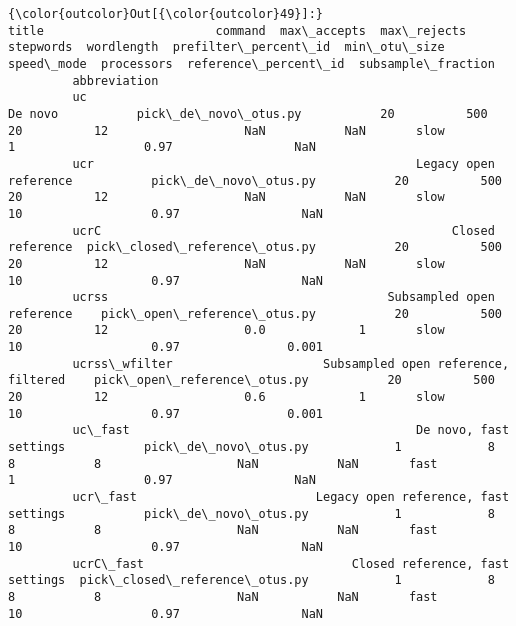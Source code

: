 \documentclass{article}
\begin{document}
            \begin{Verbatim}[commandchars=\\\{\}]
{\color{outcolor}Out[{\color{outcolor}49}]:}                                                                 title                        command  max\_accepts  max\_rejects  stepwords  wordlength  prefilter\_percent\_id  min\_otu\_size speed\_mode  processors  reference\_percent\_id  subsample\_fraction
         abbreviation                                                                                                                                                                                                                                              
         uc                                                            De novo           pick\_de\_novo\_otus.py           20          500         20          12                   NaN           NaN       slow           1                  0.97                 NaN
         ucr                                             Legacy open reference           pick\_de\_novo\_otus.py           20          500         20          12                   NaN           NaN       slow          10                  0.97                 NaN
         ucrC                                                 Closed reference  pick\_closed\_reference\_otus.py           20          500         20          12                   NaN           NaN       slow          10                  0.97                 NaN
         ucrss                                       Subsampled open reference    pick\_open\_reference\_otus.py           20          500         20          12                   0.0             1       slow          10                  0.97               0.001
         ucrss\_wfilter                     Subsampled open reference, filtered    pick\_open\_reference\_otus.py           20          500         20          12                   0.6             1       slow          10                  0.97               0.001
         uc\_fast                                        De novo, fast settings           pick\_de\_novo\_otus.py            1            8          8           8                   NaN           NaN       fast           1                  0.97                 NaN
         ucr\_fast                         Legacy open reference, fast settings           pick\_de\_novo\_otus.py            1            8          8           8                   NaN           NaN       fast          10                  0.97                 NaN
         ucrC\_fast                             Closed reference, fast settings  pick\_closed\_reference\_otus.py            1            8          8           8                   NaN           NaN       fast          10                  0.97                 NaN

\end{Verbatim}
\end{document}
